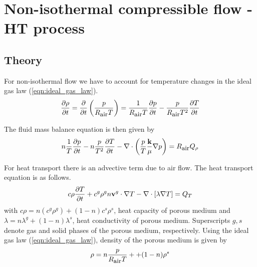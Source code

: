 \section{Non-isothermal compressible flow - HT process}
\label{sec:nonisothermal_gas_flow}

\subsection{Theory}

For non-isothermal flow we have to account for temperature changes
in the ideal gas law (\ref{eqn:ideal_gas_law}). 
%
\begin{equation}
\frac{\partial\rho}{\partial t}
=
\frac{\partial}{\partial t}
\left(
\frac{p}{R_{\mbox{\small air}}T}
\right)
=
\frac{1}{R_{\mbox{\small air}}T}
\frac{\partial p}{\partial t}
-
\frac{p}{R_{\mbox{\small air}}T^2}
\frac{\partial T}{\partial t}
\end{equation}


The fluid
mass balance equation is then given by
%
\begin{equation}
n
\frac{1}{T}
\frac{\partial p}{\partial t}
-
n
\frac{p}{T^2}
\frac{\partial T}{\partial t}
-
\nabla
\cdot
\left(
\frac{p}{T}
\frac{\mathbf{k}}{\mu}
\nabla p
\right)
=
R_{\mbox{\small air}} Q_\rho
\label{eqn:fluid_mass}
\end{equation}

%
For heat transport there is an advective term due to air flow. 
The heat transport equation is as follows.
%
\begin{equation}
c\rho
\frac{\partial T}{\partial t}
+
c^g\rho^g
n{\mathbf{v}}^g
\cdot
\nabla T
-
\nabla\cdot\left[\lambda\nabla T\right]
=
Q_T
\label{eqn:heat_transport}
\end{equation}
%
with $c\rho=n(c^g\rho^g)+(1-n)c^s\rho^s$, heat
capacity of porous medium and
$\lambda=n \lambda^g +(1-n)\lambda^s$, heat
conductivity of porous medium. Superscripts $g,s$ denote gas and solid phases of the
porous medium, respectively. Using the ideal gas law
(\ref{eqn:ideal_gas_law}), density of the porous medium is given
by
%
\begin{equation}
\rho
=
n \frac{p}{R_{\mbox{\small air}}T}
+
+
(1-n)\rho^s
\end{equation}
%

